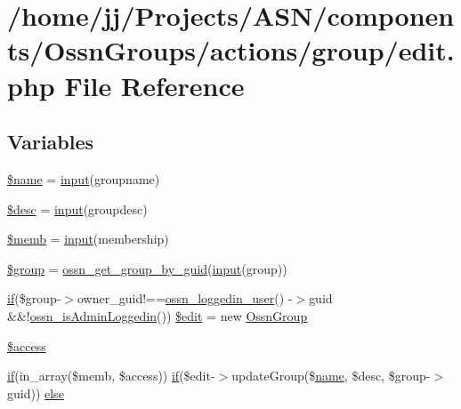 \hypertarget{components_2_ossn_groups_2actions_2group_2edit_8php}{}\section{/home/jj/\+Projects/\+A\+S\+N/components/\+Ossn\+Groups/actions/group/edit.php File Reference}
\label{components_2_ossn_groups_2actions_2group_2edit_8php}
\subsection*{Variables}
\begin{DoxyCompactItemize}
\item 
\hyperlink{components_2_ossn_groups_2actions_2group_2edit_8php_ab2fc40d43824ea3e1ce5d86dee0d763b}{\$name} = \hyperlink{ossn_8lib_8input_8php_a64ebee98b041c4f75f71ed3cd73cc8ed}{input}(\textquotesingle{}groupname\textquotesingle{})
\item 
\hyperlink{components_2_ossn_groups_2actions_2group_2edit_8php_a31059b9e4d0c5af34df20da32232ea9a}{\$desc} = \hyperlink{ossn_8lib_8input_8php_a64ebee98b041c4f75f71ed3cd73cc8ed}{input}(\textquotesingle{}groupdesc\textquotesingle{})
\item 
\hyperlink{components_2_ossn_groups_2actions_2group_2edit_8php_ade7bbae76482367aaca422378935a52d}{\$memb} = \hyperlink{ossn_8lib_8input_8php_a64ebee98b041c4f75f71ed3cd73cc8ed}{input}(\textquotesingle{}membership\textquotesingle{})
\item 
\hyperlink{components_2_ossn_groups_2actions_2group_2edit_8php_ad530a85733b0ec1dc321859fd8faa0dc}{\$group} = \hyperlink{libraries_2groups_8php_a134232596460947e7923a5ec7b255375}{ossn\+\_\+get\+\_\+group\+\_\+by\+\_\+guid}(\hyperlink{ossn_8lib_8input_8php_a64ebee98b041c4f75f71ed3cd73cc8ed}{input}(\textquotesingle{}group\textquotesingle{}))
\item 
\hyperlink{jquery_8tokeninput_8js_ad8dd46a3cbc004569e34401e9e71771a}{if}(\$group-\/$>$owner\+\_\+guid!==\hyperlink{ossn_8lib_8users_8php_aa3c8068d0e6638b414d6a2f6c62565b8}{ossn\+\_\+loggedin\+\_\+user}() -\/$>$guid \&\&!\hyperlink{ossn_8lib_8users_8php_abf45a4c659ffd196160e8173c2af1106}{ossn\+\_\+is\+Admin\+Loggedin}()) \hyperlink{components_2_ossn_groups_2actions_2group_2edit_8php_a39a4ea3de75a80df26305f97a2b76ccb}{\$edit} = new \hyperlink{class_ossn_group}{Ossn\+Group}
\item 
\hyperlink{components_2_ossn_groups_2actions_2group_2edit_8php_ad7fd03ae69de40b00cc4758c23a4404e}{\$access}
\item 
\hyperlink{jquery_8tokeninput_8js_ad8dd46a3cbc004569e34401e9e71771a}{if}(in\+\_\+array(\$memb, \$access)) \hyperlink{jquery_8tokeninput_8js_ad8dd46a3cbc004569e34401e9e71771a}{if}(\$edit-\/$>$update\+Group(\$\hyperlink{user_8php_a765af5e9671743530143a6d3670fd9a6}{name}, \$desc, \$group-\/$>$guid)) \hyperlink{components_2_ossn_groups_2actions_2group_2edit_8php_a3802405e9405d3f4c965ebac3177560b}{else}
\end{DoxyCompactItemize}


